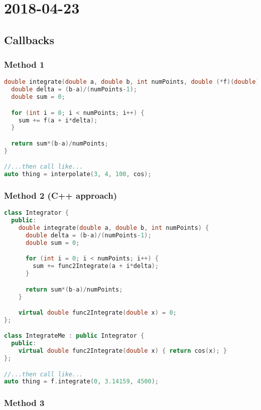 \section{2018-04-23}

\subsection{Callbacks}

\subsubsection{Method 1}

\begin{lstlisting}[language=C++]
double integrate(double a, double b, int numPoints, double (*f)(double)) {
  double delta = (b-a)/(numPoints-1);
  double sum = 0;

  for (int i = 0; i < numPoints; i++) {
    sum += f(a + i*delta);
  }

  return sum*(b-a)/numPoints;
}

//...then call like...
auto thing = interpolate(3, 4, 100, cos);
\end{lstlisting}


\subsubsection{Method 2 (C++ approach)}

\begin{lstlisting}[language=C++]
class Integrator {
  public:
    double integrate(double a, double b, int numPoints) {
      double delta = (b-a)/(numPoints-1);
      double sum = 0;

      for (int i = 0; i < numPoints; i++) {
        sum += func2Integrate(a + i*delta);
      }

      return sum*(b-a)/numPoints;
    }

    virtual double func2Integrate(double x) = 0;
};

class IntegrateMe : public Integrator {
  public:
    virtual double func2Integrate(double x) { return cos(x); }
};

//...then call like...
auto thing = f.integrate(0, 3.14159, 4500);
\end{lstlisting}


\subsubsection{Method 3}
